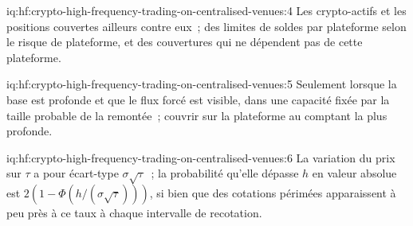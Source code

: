 \begin{solution}{iq:hf:crypto-high-frequency-trading-on-centralised-venues:4}
Les crypto-actifs et les positions couvertes ailleurs contre eux~; des limites de soldes par plateforme selon le risque de plateforme, et des couvertures qui ne dépendent pas de
cette plateforme.
\end{solution}

\begin{solution}{iq:hf:crypto-high-frequency-trading-on-centralised-venues:5}
Seulement lorsque la base est profonde et que le flux forcé est visible, dans une capacité fixée par la taille probable de la remontée~; couvrir sur la plateforme au comptant la plus profonde.
\end{solution}

\begin{solution}{iq:hf:crypto-high-frequency-trading-on-centralised-venues:6}
La variation du prix sur $\tau$ a pour écart-type $\sigma\sqrt\tau$~; la probabilité qu'elle dépasse $h$ en valeur absolue est $2(1-\Phi(h/(\sigma\sqrt\tau)))$,
si bien que des cotations périmées apparaissent à peu près à ce taux à chaque intervalle de recotation.
\end{solution}
